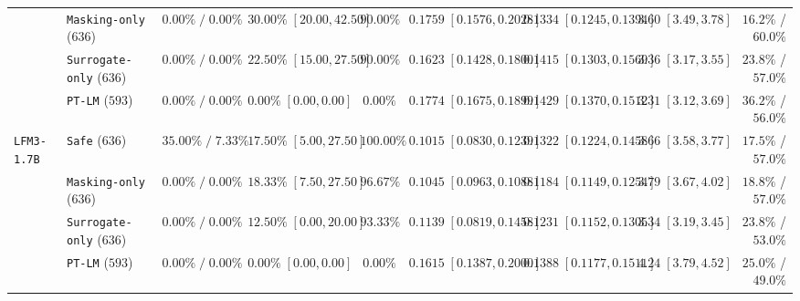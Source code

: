 \documentclass{article}
\begin{document}
\begin{table}[t]
\begin{center}
{\begin{tabular}{llrrrrrrr}
 & \texttt{Masking-only} ($636$) & $\mathbf{0.00\%\;/\;0.00\%}$ & $30.00\%\;[20.00, 42.50]$ & $90.00\%$ & $0.1759\;[0.1576, 0.2028]$ & $0.1334\;[0.1245, 0.1394]$ & $3.60\;[3.49, 3.78]$ & $16.2\%$ / $\mathbf{60.0\%}$ \\
 & \texttt{Surrogate-only} ($636$) & $\mathbf{0.00\%\;/\;0.00\%}$ & $22.50\%\;[15.00, 27.50]$ & $90.00\%$ & $0.1623\;[0.1428, 0.1800]$ & $0.1415\;[0.1303, 0.1569]$ & $3.36\;[3.17, 3.55]$ & $23.8\%$ / $57.0\%$ \\
 & \texttt{PT-LM} ($593$) & $\mathbf{0.00\%\;/\;0.00\%}$ & $\mathbf{0.00\%\;[0.00, 0.00]}$ & $0.00\%$ & $\mathbf{0.1774}\;[0.1675, 0.1899]$ & $\mathbf{0.1429}\;[0.1370, 0.1512]$ & $\mathbf{3.31}\;[3.12, 3.69]$ & $\mathbf{36.2\%}$ / $56.0\%$ \\
\midrule
\texttt{LFM3-1.7B} & \texttt{Safe} ($636$) & $35.00\%\;/\;7.33\%$ & $17.50\%\;[5.00, 27.50]$ & $100.00\%$ & $0.1015\;[0.0830, 0.1239]$ & $0.1322\;[0.1224, 0.1458]$ & $3.66\;[3.58, 3.77]$ & $17.5\%$ / $\mathbf{57.0\%}$ \\
 & \texttt{Masking-only} ($636$) & $\mathbf{0.00\%\;/\;0.00\%}$ & $18.33\%\;[7.50, 27.50]$ & $96.67\%$ & $0.1045\;[0.0963, 0.1088]$ & $0.1184\;[0.1149, 0.1254]$ & $3.79\;[3.67, 4.02]$ & $18.8\%$ / $\mathbf{57.0\%}$ \\
 & \texttt{Surrogate-only} ($636$) & $\mathbf{0.00\%\;/\;0.00\%}$ & $12.50\%\;[0.00, 20.00]$ & $93.33\%$ & $0.1139\;[0.0819, 0.1458]$ & $0.1231\;[0.1152, 0.1305]$ & $\mathbf{3.34}\;[3.19, 3.45]$ & $23.8\%$ / $53.0\%$ \\
 & \texttt{PT-LM} ($593$) & $\mathbf{0.00\%\;/\;0.00\%}$ & $\mathbf{0.00\%\;[0.00, 0.00]}$ & $0.00\%$ & $\mathbf{0.1615}\;[0.1387, 0.2000]$ & $\mathbf{0.1388}\;[0.1177, 0.1511]$ & $4.24\;[3.79, 4.52]$ & $\mathbf{25.0\%}$ / $49.0\%$ \\
\bottomrule
\end{tabular}%
}
\end{center}
\vskip -0.14in
\end{table}
\end{document}
